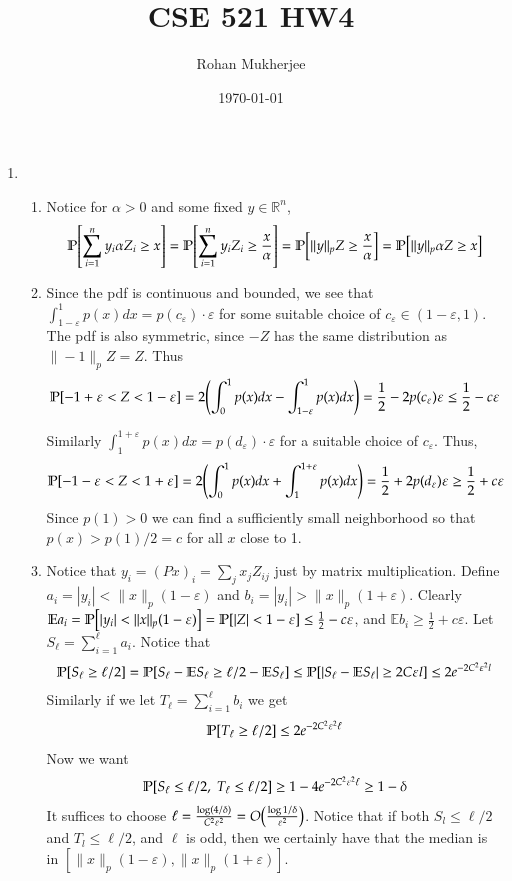 \documentclass[12pt]{article}
\title{CSE 521 HW4}
\date{\today}
\author{Rohan Mukherjee}
\theoremstyle{definitionstyle}
\def\mbb#1{\mathbb{#1}}
\def \R{\mbb{R}}
\def \ve{\varepsilon}
\newcommand{\mg}[1]{\| #1 \|}
\renewcommand{\P}{\mathbb{P}\qty}
\renewcommand{\O}{O\qty}
\newcommand{\lp}[1]{\mg{#1}_p}
\begin{document}
	\maketitle
	\begin{enumerate}[leftmargin=\labelsep]
		\item \begin{enumerate}
			\item Notice for $\alpha > 0$ and some fixed $y \in \R^n$, 
			\begin{align*}
				\P[\sum_{i=1}^n y_i \alpha Z_i \geq x] = \P[\sum_{i=1}^n y_i Z_i \geq \frac{x}{\alpha}] = \P[\mg{y}_p Z \geq \frac{x}{\alpha}] = \P[\mg{y}_p \alpha Z \geq x]
			\end{align*}
		
			\item Since the pdf is continuous and bounded, we see that $\int_{1-\ve}^1 p(x)dx = p(c_\ve) \cdot \ve$ for some suitable choice of $c_\ve \in (1-\ve, 1)$. The pdf is also symmetric, since $-Z$ has the same distribution as $\mg{-1}_p Z = Z$. Thus 
			\begin{align*}
				\P[-1 + \ve < Z < 1 - \ve] = 2\qty(\int_0^1 p(x)dx - \int_{1-\ve}^{1} p(x)dx) = \frac 12 - 2p(c_\ve) \ve \leq \frac12 - c \ve
			\end{align*}
		
			Similarly $\int_{1}^{1+\ve} p(x)dx = p(d_\ve) \cdot \ve$ for a suitable choice of $c_\ve$. Thus,
			\begin{align*}
				\P[-1-\ve < Z < 1 + \ve] = 2\qty(\int_0^1 p(x)dx + \int_{1}^{1+\ve} p(x)dx) = \frac12 + 2p(d_\ve)\ve \geq \frac12 + c \ve
			\end{align*}
			Since $p(1) > 0$ we can find a sufficiently small neighborhood so that $p(x) > p(1)/2=c$ for all $x$ close to 1. 
		
			\item Notice that $y_i = (Px)_i = \sum_j x_j Z_{ij}$ just by matrix multiplication. Define $a_i = |y_i| < \lp{x}(1-\ve)$ and $b_i = |y_i| > \lp{x}(1+\ve)$. Clearly $\mbb E a_i = \P[|y_i| < \lp{x}(1-\ve)] = \P[|Z| < 1-\ve] \leq \frac12 - c\ve$, and $\mbb E b_i \geq \frac12 + c\ve$. Let $S_\ell = \sum_{i=1}^\ell a_i$. Notice that
			\begin{align*}
				\P[S_\ell \geq \ell/2] = \P[S_\ell - \mbb E S_\ell \geq \ell/2 - \mbb E S_\ell] \leq \P[|S_\ell - \mbb E S_\ell| \geq 2C\ve l] \leq 2e^{-2C^2 \ve^2 l}
			\end{align*}
			Similarly if we let $T_\ell = \sum_{i=1}^\ell b_i$ we get
			\begin{align*}
				\P[T_\ell \geq \ell/2] \leq 2e^{-2C^2\ve^2 \ell}
			\end{align*}
			Now we want 
			\begin{align*}
				\P[S_\ell \leq \ell/2, \; T_\ell \leq \ell/2] \geq 1 - 4e^{-2C^2\ve^2\ell} \geq 1 - \delta
			\end{align*}
			It suffices to choose $\ell = \frac{\log(4/\delta)}{C^2\ve^2} = \O(\frac{\log 1/\delta}{\ve^2})$. Notice that if both $S_l \leq \ell/2$ and $T_l \leq \ell/2$, and $\ell$ is odd, then we certainly have that the median is in $[\lp{x}(1-\ve), \lp{x}(1+\ve)]$.
			

\end{enumerate}
\end{enumerate}
\end{document}

